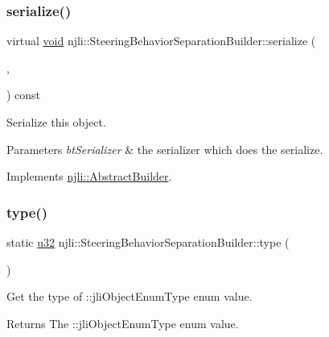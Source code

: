 \subsubsection{\texorpdfstring{serialize()}{serialize()}}
{\footnotesize\ttfamily virtual \mbox{\hyperlink{_thread_8h_af1e856da2e658414cb2456cb6f7ebc66}{void}} njli\+::\+Steering\+Behavior\+Separation\+Builder\+::serialize (\begin{DoxyParamCaption}\item[{\mbox{\hyperlink{_thread_8h_af1e856da2e658414cb2456cb6f7ebc66}{void}} $\ast$}]{,  }\item[{bt\+Serializer $\ast$}]{ }\end{DoxyParamCaption}) const\hspace{0.3cm}{\ttfamily [virtual]}}

Serialize this object.


\begin{DoxyParams}{Parameters}
{\em bt\+Serializer} & the serializer which does the serialize. \\
\hline
\end{DoxyParams}


Implements \mbox{\hyperlink{classnjli_1_1_abstract_builder_ab66b774e02ccb9da554c9aab7fa6d981}{njli\+::\+Abstract\+Builder}}.

\mbox{\label{classnjli_1_1_steering_behavior_separation_builder_a5e77abdfe51a525207cd6aca7d741994}} 
\subsubsection{\texorpdfstring{type()}{type()}}
{\footnotesize\ttfamily static \mbox{\hyperlink{_util_8h_a10e94b422ef0c20dcdec20d31a1f5049}{u32}} njli\+::\+Steering\+Behavior\+Separation\+Builder\+::type (\begin{DoxyParamCaption}{ }\end{DoxyParamCaption})\hspace{0.3cm}{\ttfamily [static]}}

Get the type of \+::jli\+Object\+Enum\+Type enum value.

\begin{DoxyReturn}{Returns}
The \+::jli\+Object\+Enum\+Type enum value. 
\end{DoxyReturn}


